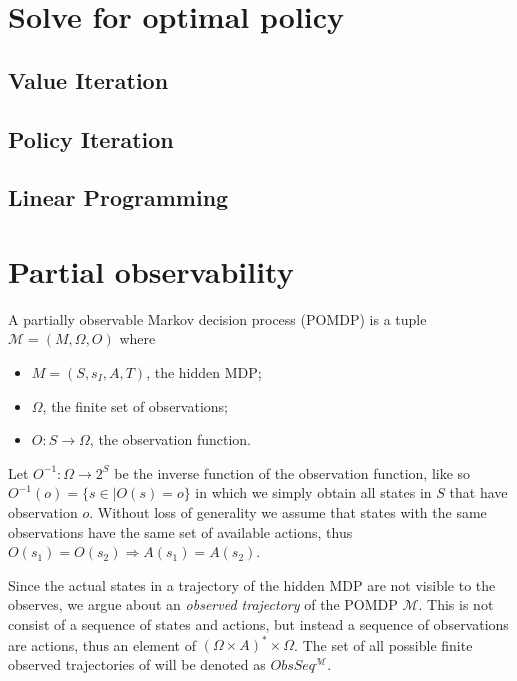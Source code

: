 \section{Solve for optimal policy}
\subsection*{Value Iteration}

\subsection*{Policy Iteration}

\subsection*{Linear Programming}

\section{Partial observability}

\begin{definition}[POMDP]
	A partially observable Markov decision process (POMDP) is a tuple $\mathcal{M}=(M, \Omega, O)$ where 
	\begin{itemize}
		\item $M=(S,s_I,A,T)$, the hidden MDP;
		\item $\Omega$, the finite set of observations;
		\item $O:S\to \Omega$, the observation function. %
	\end{itemize}
\end{definition}

Let $O^{-1}:\Omega\to 2^S$ be the inverse function of the observation function, like so $O^{-1}(o)=\{s\in \mid O(s)=o\}$ in which we simply obtain all states in $S$ that have observation $o$.
Without loss of generality we assume that states with the same observations have the same set of available actions, thus $O(s_1)=O(s_2)\Rightarrow A(s_1)=A(s_2)$.

Since the actual states in a trajectory of the hidden MDP are not visible to the observes, we argue about an \textit{observed trajectory} of the POMDP $\mathcal{M}$. This is not consist of a sequence of states and actions, but instead a sequence of observations are actions, thus an element of $(\Omega\times A)^*\times \Omega$. The set of all possible finite observed trajectories of will be denoted as $ObsSeq^{\mathcal{M}}$.

